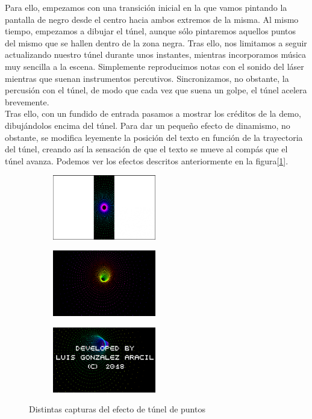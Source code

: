 Para ello, empezamos con una transición inicial en la que vamos pintando la pantalla de negro desde el centro hacia ambos extremos de la misma. Al mismo tiempo, empezamos a dibujar el túnel, aunque sólo pintaremos aquellos puntos del mismo que se hallen dentro de la zona negra. Tras ello, nos limitamos a seguir actualizando nuestro túnel durante unos instantes, mientras incorporamos música muy sencilla a la escena. Simplemente reproducimos notas con el sonido del láser mientras que suenan instrumentos percutivos. Sincronizamos, no obstante, la percusión con el túnel, de modo que cada vez que suena un golpe, el túnel acelera brevemente.\\

Tras ello, con un fundido de entrada pasamos a mostrar los créditos de la demo, dibujándolos encima del túnel. Para dar un pequeño efecto de dinamismo, no obstante, se modifica leyemente la posición del texto en función de la trayectoria del túnel, creando así la sensación de que el texto se mueve al compás que el túnel avanza. Podemos ver los efectos descritos anteriormente en la figura[\ref{fig:finaltunel}].\\

\begin{figure}[h]
	\centering
	\begin{subfigure}[b]{0.3\textwidth}
		\centering
		\includegraphics[width=4.5cm]{archivos/tunel1}
	\end{subfigure}
	\begin{subfigure}[b]{0.3\textwidth}
		\centering
		\includegraphics[width=4.5cm]{archivos/tunel2}
	\end{subfigure}
	\begin{subfigure}[b]{0.3\textwidth}
		\centering
		\includegraphics[width=4.5cm]{archivos/tunel3}
	\end{subfigure}
	\caption{Distintas capturas del efecto de túnel de puntos}
	\label{fig:finaltunel}
\end{figure}

